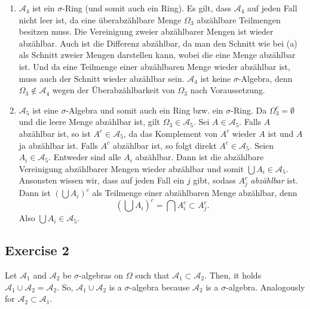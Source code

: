 \documentclass[a4paper]{article}
\begin{document}
\begin{enumerate}[label=(\roman*)]
\begin{enumerate}
\item $\mathcal A_4$ ist ein $\sigma$-Ring (und somit auch ein Ring). Es gilt, dass $\mathcal A_4$ auf jeden Fall nicht leer ist, da eine überabzählbare Menge $\Omega_3$ abzählbare Teilmengen besitzen muss. Die Vereinigung zweier abzählbarer Mengen ist wieder abzählbar. Auch ist die Differenz abzählbar, da man den Schnitt wie bei (a) als Schnitt zweier Mengen darstellen kann, wobei die eine Menge abzählbar ist. Und da eine Teilmenge einer abzählbaren Menge wieder abzählbar ist, muss auch der Schnitt wieder abzählbar sein. $\mathcal A_4$ ist keine $\sigma$-Algebra, denn $\Omega_3 \notin \mathcal A_4$ wegen der Überabzählbarkeit von $\Omega_3$ nach Voraussetzung.

\item $\mathcal A_5$ ist eine $\sigma$-Algebra und somit auch ein Ring bzw. ein $\sigma$-Ring. Da $\Omega_3^c = \emptyset$ und die leere Menge abzählbar ist, gilt $\Omega_3 \in \mathcal A_5$. Sei $A \in \mathcal A_5$. Falls $A$ abzählbar ist, so ist $A^c \in \mathcal A_5$, da das Komplement von $A^c$ wieder $A$ ist und $A$ ja abzählbar ist. Falls $A^c$ abzählbar ist, so folgt direkt $A^c \in \mathcal A_5$. Seien $A_i \in \mathcal A_5$. Entweder sind alle $A_i$ abzählbar. Dann ist die abzählbare Vereinigung abzählbarer Mengen wieder abzählbar und somit $\bigcup A_i \in \mathcal A_5$. Ansonsten wissen wir, dass auf jeden Fall ein $j$ gibt, sodass $A_j^c$ \emph{abzählbar} ist. Dann ist $(\bigcup A_i)^c$ als Teilmenge einer abzählbaren Menge abzählbar, denn $$(\bigcup A_i)^c = \bigcap A_i^c \subset A_j^c.$$
Also $\bigcup A_i \in \mathcal A_5$.
\end{enumerate}
\end{enumerate}

\iffalse
\subsection*{Exercise 2}
Let $\mathcal A_1$ and $\mathcal A_2$ be $\sigma$-algebras on $\Omega$ such that $\mathcal A_1 \subset \mathcal A_2$. Then, it holds $\mathcal A_1 \cup \mathcal A_2 = \mathcal A_2$. So, $\mathcal A_1 \cup \mathcal A_2$ is a $\sigma$-algebra because $\mathcal A_2$ is a $\sigma$-algebra. Analogously for $\mathcal A_2 \subset \mathcal A_1$.
\end{document}
